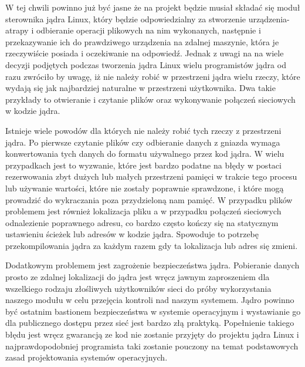 
W tej chwili powinno już być jasne że na projekt będzie musiał składać
się moduł sterownika jądra Linux, który będzie odpowiedzialny za
stworzenie urządzenia-atrapy i odbieranie operacji plikowych na nim
wykonanych, następnie i przekazywanie ich do prawdziwego urządzenia na
zdalnej maszynie, która je rzeczywiście posiada i oczekiwanie na
odpowiedź. Jednak z uwagi na na wiele decyzji podjętych podczas
tworzenia jądra Linux wielu programistów jądra od razu zwróciło by
uwagę, iż nie należy robić w przestrzeni jądra wielu rzeczy, które
wydają się jak najbardziej naturalne w przestrzeni użytkownika. Dwa
takie przykłady to otwieranie i czytanie plików oraz wykonywanie
połączeń sieciowych w kodzie jądra.

Istnieje wiele powodów dla których nie należy robić tych rzeczy z
przestrzeni jądra. Po pierwsze czytanie plików czy odbieranie danych z
gniazda wymaga konwertowania tych danych do formatu używalnego przez kod
jądra. W wielu przypadkach jest to wyzwanie, które jest bardzo podatne
na błędy w postaci rezerwowania zbyt dużych lub małych przestrzeni
pamięci w trakcie tego procesu lub używanie wartości, które nie zostały
poprawnie sprawdzone, i które mogą prowadzić do wykraczania poza
przydzieloną nam pamięć. W przypadku plików problemem jest również
lokalizacja pliku a w przypadku połączeń sieciowych odnalezienie
poprawnego adresu, co bardzo często kończy się na statycznym ustawieniu
ścieżek lub adresów w kodzie jądra. Spowoduje to potrzebę
przekompilowania jądra za każdym razem gdy ta lokalizacja lub adres się
zmieni.

Dodatkowym problemem jest zagrożenie bezpieczeństwa jądra. Pobieranie
danych prosto ze zdalnej lokalizacji do jądra jest wręcz jawnym
zaproszeniem dla wszelkiego rodzaju złośliwych użytkowników sieci do
próby wykorzystania naszego modułu w celu przejęcia kontroli nad naszym
systemem. Jądro powinno być ostatnim bastionem bezpieczeństwa w systemie
operacyjnym i wystawianie go dla publicznego dostępu przez sieć jest
bardzo złą praktyką. Popełnienie takiego błędu jest wręcz gwarancją ze
kod nie zostanie przyjęty do projektu jądra Linux i najprawdopodobniej
programista taki zostanie pouczony na temat podstawowych zasad
projektowania systemów operacyjnych.

